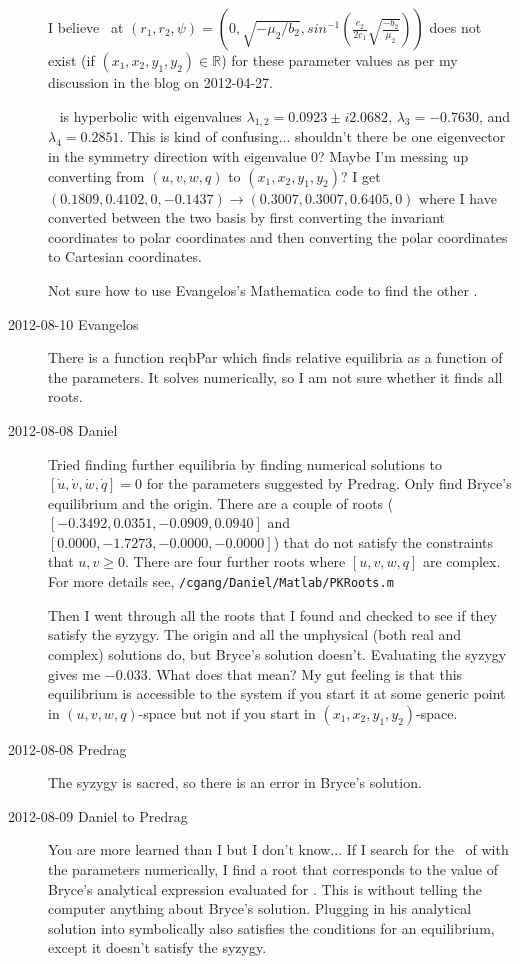 \begin{description}
I believe \reqv\ at $\left(r_1,r_2,\psi\right) =\left(0,\sqrt{-\mu_2 /
b_2}, sin^{-1}\left(\frac{e_2}{2 c_1}
\sqrt{\frac{-b_2}{\mu_2}}\right)\right)$ does not exist (if
$(x_1,x_2,y_1,y_2) \in \mathbb{R}$) for these parameter values as per my
discussion in the blog on 2012-04-27.

\Reqv\  is hyperbolic with eigenvalues $\lambda_{1,2} = 0.0923
\pm i 2.0682$, $\lambda_3 = -0.7630$, and $\lambda_4 = 0.2851$. This is
kind of confusing... shouldn't there be one eigenvector in the symmetry
direction with eigenvalue $0$? Maybe I'm messing up converting from
$(u,v,w,q)$ to $(x_1,x_2,y_1,y_2)$? I get $(0.1809,0.4102,0,-0.1437)
\rightarrow (0.3007,0.3007,0.6405,0)$ where I have converted between the
two basis by first converting the invariant coordinates to polar
coordinates and then converting the polar coordinates to Cartesian
coordinates.

Not sure how to use Evangelos's Mathematica code to find the other \eqva .

\item[2012-08-10 Evangelos] There is a function reqbPar which finds
relative equilibria as a function of the parameters. It solves
 numerically, so I am not sure whether it finds all
roots.

\item[2012-08-08 Daniel] Tried finding further equilibria by finding
numerical solutions to $[\dot{u},\dot{v},\dot{w},\dot{q}] = 0$ for the
parameters suggested by Predrag. Only find Bryce's equilibrium and the
origin. There are a couple of roots ($[-0.3492,0.0351,-0.0909,0.0940]$
and $[0.0000,-1.7273,-0.0000,-0.0000]$) that do not satisfy the
constraints that $u,v \geq 0$. There are four further roots where
$[u,v,w,q]$ are complex. For more details see,
\texttt{/cgang/Daniel/Matlab/PKRoots.m}

Then I went through all the roots that I found and checked to see if they
satisfy the syzygy. The origin and all the unphysical (both real and
complex) solutions do, but Bryce's solution doesn't. Evaluating the
syzygy gives me $-0.033$. What does that mean? My gut feeling is that
this equilibrium is accessible to the system if you start it at some
generic point in $(u,v,w,q)$-space but not if you start in
$(x_1,x_2,y_1,y_2)$-space.

\item[2012-08-08 Predrag]
The syzygy  is sacred, so there is an error in Bryce's
solution.

\item[2012-08-09 Daniel to Predrag] You are more learned than I but I
don't know... If I search for the \eqva\ of  with the
parameters  numerically, I find a root that
corresponds to the value of Bryce's analytical expression
 evaluated for . This is without
telling the computer anything about Bryce's solution. Plugging in his
analytical solution into  symbolically also satisfies
the conditions for an equilibrium, except it doesn't satisfy the syzygy.


\end{description}
